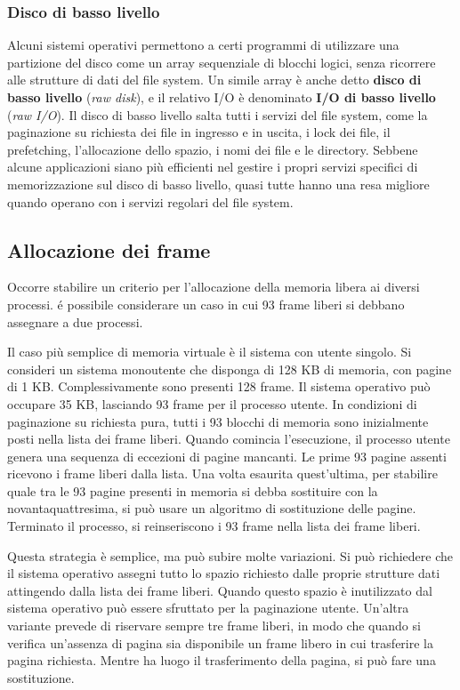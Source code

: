 \documentclass[11pt,a4paper]{article}
\begin{document}
\subsubsection{Disco di basso livello}
Alcuni sistemi operativi permettono a certi programmi di
utilizzare una partizione del disco come un array sequenziale di blocchi logici, senza ricorre­re alle strutture di dati del file system. Un simile array è anche detto \textbf{disco di basso livello}
(\emph{raw disk}), e il relativo I/O è denominato \textbf{I/O di basso livello} (\emph{raw I/O}). Il disco di basso li­vello salta tutti i servizi del file system, come la paginazione su richiesta dei file in ingresso e in uscita, i lock dei file, il prefetching, l'allocazione dello spazio, i nomi dei file e le directo­ry. Sebbene alcune applicazioni siano più efficienti nel gestire i propri servizi specifici di memorizzazione sul disco di basso livello, quasi tutte hanno una resa migliore
quando operano con i servizi regolari del file system.

\subsection{Allocazione dei frame}
Occorre stabilire un criterio per l'allocazione della memoria libera ai diversi processi. é possibile considerare un caso in cui 93 frame liberi si debbano assegnare a due processi.

Il caso più semplice di memoria virtuale è il sistema con utente singolo. Si consideri un
sistema monoutente che disponga di 128 KB di memoria, con pagine di 1 KB. Complessiva­mente sono presenti 128 frame. Il sistema operativo può occupare 35 KB, lasciando 93 fra­me per il processo utente. In condizioni di paginazione su richiesta pura, tutti i 93 blocchi di memoria sono inizialmente posti nella lista dei frame liberi. Quando comincia l'esecuzio­ne, il processo utente genera una sequenza di eccezioni di pagine mancanti. Le prime 93 pa­gine assenti ricevono i frame liberi dalla lista. Una volta esaurita quest'ultima, per stabilire quale tra le 93 pagine presenti in memoria si debba sostituire con la novantaquattresima, si può usare un algoritmo di sostituzione delle pagine. Terminato il processo, si reinseriscono i 93 frame nella lista dei frame liberi.

Questa strategia è semplice, ma può subire molte variazioni. Si può richiedere che il si­stema operativo assegni tutto lo spazio richiesto dalle proprie strutture dati attingendo dalla lista dei frame liberi. Quando questo spazio è inutilizzato dal sistema operativo può essere sfruttato per la paginazione utente. Un'altra variante prevede di riservare sempre tre frame liberi, in modo che quando si verifica un'assenza di pagina sia disponibile un frame libero in cui trasferire la pagina richiesta. Mentre ha luogo il trasferimento della pagina, si può fare una sostituzione.
\end{document}
